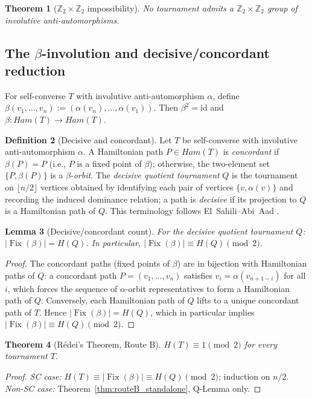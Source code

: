 \documentclass[12pt,reqno]{amsart}
\theoremstyle{plain}
\newtheorem{theorem}{Theorem}[section]
\newtheorem{lemma}[theorem]{Lemma}
\theoremstyle{definition}
\newtheorem{definition}[theorem]{Definition}
\theoremstyle{remark}
\DeclareMathOperator{\Fix}{Fix}
\newcommand{\Ham}{\mathrm{Ham}}
\newcommand{\id}{\mathrm{id}}
\newcommand{\routeB}{\textcolor{axisred}{\textbf{Route~B}}}
\renewcommand{\Ham}{Ham}%
\renewcommand{\routeB}{Route B}%
\begin{document}
\begin{theorem}[$\mathbb{Z}_2\times\mathbb{Z}_2$ impossibility]\label{thm:z2z2}
No tournament admits a $\mathbb{Z}_2\times\mathbb{Z}_2$ group of involutive
anti-automorphisms.
\end{theorem}

\subsection{The $\beta$-involution and decisive/concordant reduction}

For self-converse $T$ with involutive anti-automorphism $\alpha$, define
$\beta(v_1,\ldots,v_n) := (\alpha(v_n),\ldots,\alpha(v_1))$.
Then $\beta^2=\id$ and $\beta:\Ham(T)\to\Ham(T)$.

\begin{definition}[Decisive and concordant]\label{def:dc}
Let $T$ be self-converse with involutive anti-automorphism $\alpha$.
A Hamiltonian path $P\in\Ham(T)$ is \emph{concordant} if $\beta(P)=P$
(i.e., $P$ is a fixed point of $\beta$); otherwise, the two-element set $\{P,\beta(P)\}$
is a $\beta$-\emph{orbit}. The \emph{decisive quotient tournament} $Q$ is the
tournament on $\lfloor n/2\rfloor$ vertices obtained by identifying each pair of
vertices $\{v,\alpha(v)\}$ and recording the induced dominance relation;
a path is \emph{decisive} if its projection to $Q$ is a Hamiltonian path of $Q$.
This terminology follows El~Sahili--Abi~Aad \cite{elsahili2020}.
\end{definition}

\begin{lemma}[Decisive/concordant count]\label{lem:dc}
For the decisive quotient tournament $Q$: $|\Fix(\beta)| = H(Q)$.
In particular, $|\Fix(\beta)|\equiv H(Q)\pmod{2}$.
\end{lemma}
\begin{proof}
The concordant paths (fixed points of $\beta$) are in bijection with
Hamiltonian paths of $Q$: a concordant path $P=(v_1,\ldots,v_n)$ satisfies
$v_i = \alpha(v_{n+1-i})$ for all $i$, which forces the sequence of
$\alpha$-orbit representatives to form a Hamiltonian path of $Q$.
Conversely, each Hamiltonian path of $Q$ lifts to a unique concordant path of $T$.
Hence $|\Fix(\beta)| = H(Q)$, which in particular implies $|\Fix(\beta)|\equiv H(Q)\pmod2$.
\end{proof}

\begin{theorem}[Rédei's Theorem, \routeB]\label{thm:routeB}
$H(T)\equiv 1\pmod{2}$ for every tournament $T$.
\end{theorem}
\begin{proof}
\emph{SC case:} $H(T)\equiv|\Fix(\beta)|\equiv H(Q)\pmod2$; induction on $n/2$.
\emph{Non-SC case:} Theorem~\ref{thm:routeB_standalone}, Q-Lemma only.
\end{proof}
\end{document}
